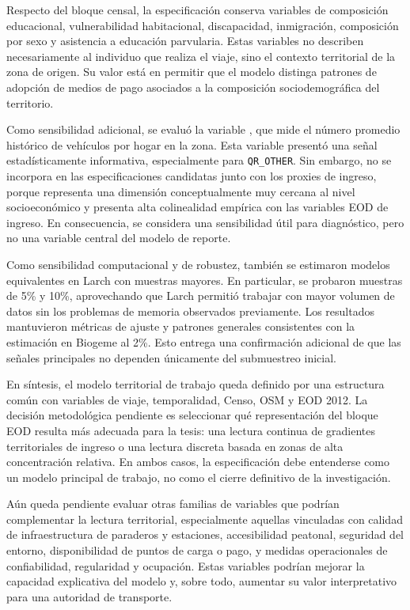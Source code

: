 Respecto del bloque censal, la especificación conserva variables de composición educacional,
vulnerabilidad habitacional, discapacidad, inmigración, composición por sexo y asistencia a educación
parvularia. Estas variables no describen necesariamente al individuo que realiza el viaje, sino el
contexto territorial de la zona de origen. Su valor está en permitir que el modelo distinga patrones
de adopción de medios de pago asociados a la composición sociodemográfica del territorio.

Como sensibilidad adicional, se evaluó la variable , que mide el número
promedio histórico de vehículos por hogar en la zona. Esta variable presentó una señal
estadísticamente informativa, especialmente para \texttt{QR\_OTHER}. Sin embargo, no se incorpora en
las especificaciones candidatas junto con los proxies de ingreso, porque representa una dimensión
conceptualmente muy cercana al nivel socioeconómico y presenta alta colinealidad empírica con las
variables EOD de ingreso. En consecuencia, se considera una sensibilidad útil para diagnóstico, pero
no una variable central del modelo de reporte.

Como sensibilidad computacional y de robustez, también se estimaron modelos equivalentes en Larch con
muestras mayores. En particular, se probaron muestras de 5\% y 10\%, aprovechando que Larch permitió
trabajar con mayor volumen de datos sin los problemas de memoria observados previamente. Los
resultados mantuvieron métricas de ajuste y patrones generales consistentes con la estimación en
Biogeme al 2\%. Esto entrega una confirmación adicional de que las señales principales no dependen
únicamente del submuestreo inicial.

En síntesis, el modelo territorial de trabajo queda definido por una estructura común con variables
de viaje, temporalidad, Censo, OSM y EOD 2012. La decisión metodológica pendiente es seleccionar qué
representación del bloque EOD resulta más adecuada para la tesis: una lectura continua de gradientes
territoriales de ingreso o una lectura discreta basada en zonas de alta concentración relativa. En
ambos casos, la especificación debe entenderse como un modelo principal de trabajo, no como el cierre
definitivo de la investigación.

Aún queda pendiente evaluar otras familias de variables que podrían complementar la lectura
territorial, especialmente aquellas vinculadas con calidad de infraestructura de paraderos y
estaciones, accesibilidad peatonal, seguridad del entorno, disponibilidad de puntos de carga o pago,
y medidas operacionales de confiabilidad, regularidad y ocupación. Estas variables podrían mejorar
la capacidad explicativa del modelo y, sobre todo, aumentar su valor interpretativo para una
autoridad de transporte.
